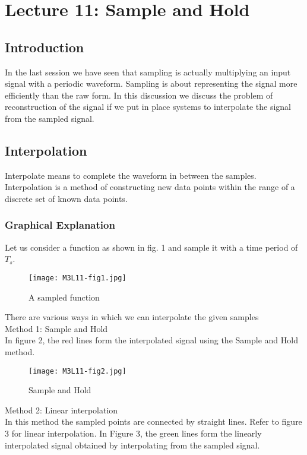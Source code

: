 \section{Lecture 11: Sample and Hold}

\subsection{Introduction}
In the last session we have seen that sampling is actually multiplying an input signal with a periodic waveform. Sampling is about representing the signal more efficiently than the raw form. 
In this discussion we discuss the problem of reconstruction of the signal if we put in place systems to interpolate the signal from the sampled signal.

\subsection{Interpolation}
Interpolate means to complete the waveform in between the samples. Interpolation is a method of constructing new data points within the range of a discrete set of known data points.

\subsubsection{Graphical Explanation}

Let us consider a function as shown in fig. 1 and sample it with a time period of $T_{s}$.

\begin{figure}[ht]
\centering
\texttt{[image: M3L11-fig1.jpg]}
\caption{A sampled function}
\end{figure}

There are various ways in which we can interpolate the given samples\\


\noindent Method 1: Sample and Hold\\
\noindent In figure 2, the red lines form the interpolated signal using the Sample and Hold method.

\begin{figure}[ht]
\centering
\texttt{[image: M3L11-fig2.jpg]}
\caption{Sample and Hold}
\end{figure}


\noindent Method 2: Linear interpolation\\
In this method the sampled points are connected by straight lines. Refer to figure 3 for linear interpolation.
In Figure 3, the green lines form the linearly interpolated signal obtained by interpolating from the sampled signal.



